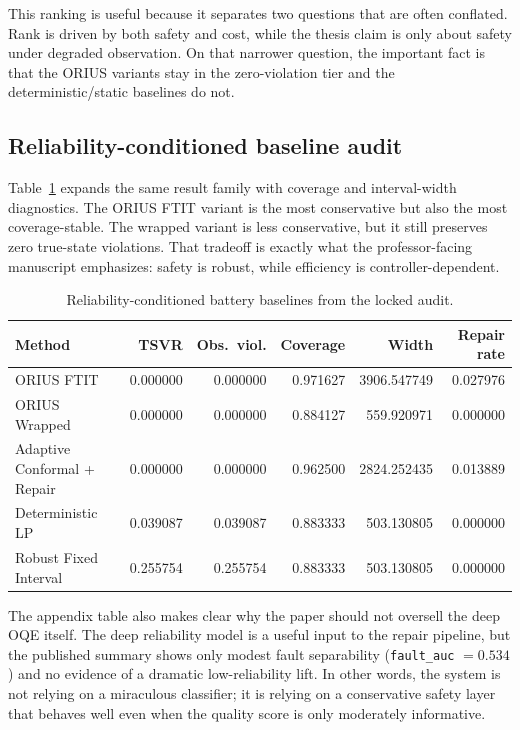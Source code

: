 This ranking is useful because it separates two questions that are often
conflated.  Rank is driven by both safety and cost, while the thesis claim is
only about safety under degraded observation.  On that narrower question, the
important fact is that the ORIUS variants stay in the zero-violation tier and
the deterministic/static baselines do not.

\subsection{Reliability-conditioned baseline audit}
Table~\ref{tab:prof-reliability-baselines} expands the same result family with
coverage and interval-width diagnostics.  The ORIUS FTIT variant is the most
conservative but also the most coverage-stable.  The wrapped variant is less
conservative, but it still preserves zero true-state violations.  That tradeoff
is exactly what the professor-facing manuscript emphasizes: safety is
robust, while efficiency is controller-dependent.

\begin{table}[t]
\centering
\small
\caption{Reliability-conditioned battery baselines from the locked audit.}
\label{tab:prof-reliability-baselines}
\begin{tabular}{lrrrrr}
\toprule
\textbf{Method} & \textbf{TSVR} & \textbf{Obs.\ viol.} & \textbf{Coverage} &
\textbf{Width} & \textbf{Repair rate} \\
\midrule
ORIUS FTIT & 0.000000 & 0.000000 & 0.971627 & 3906.547749 & 0.027976 \\
ORIUS Wrapped & 0.000000 & 0.000000 & 0.884127 & 559.920971 & 0.000000 \\
Adaptive Conformal + Repair & 0.000000 & 0.000000 & 0.962500 & 2824.252435 & 0.013889 \\
Deterministic LP & 0.039087 & 0.039087 & 0.883333 & 503.130805 & 0.000000 \\
Robust Fixed Interval & 0.255754 & 0.255754 & 0.883333 & 503.130805 & 0.000000 \\
\bottomrule
\end{tabular}
\end{table}

The appendix table also makes clear why the paper should not oversell the
deep OQE itself.  The deep reliability model is a useful input to the repair
pipeline, but the published summary shows only modest fault separability
(\texttt{fault\_auc} $=0.534$) and no evidence of a dramatic low-reliability
lift.  In other words, the system is not relying on a miraculous classifier; it
is relying on a conservative safety layer that behaves well even when the
quality score is only moderately informative.

